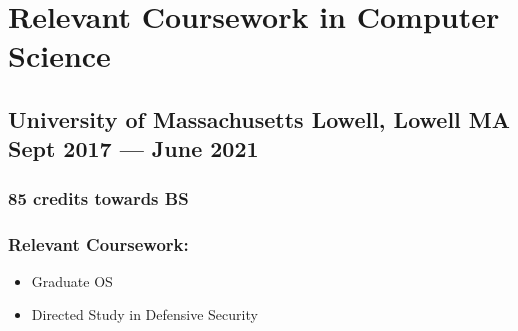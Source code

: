 \documentclass[11pt]{article}
\begin{document}
\section{Relevant Coursework in Computer Science}
\subsection{University of Massachusetts Lowell, Lowell MA\hspace*{\fill} Sept 2017 --- June 2021}
\subsubsection{85 credits towards BS}
\subsubsection{Relevant Coursework:}
\begin{itemize}[noitemsep, topsep=0pt]
	\item[] Graduate OS
	\item[] Directed Study in Defensive Security
\end{itemize}
\end{document}
